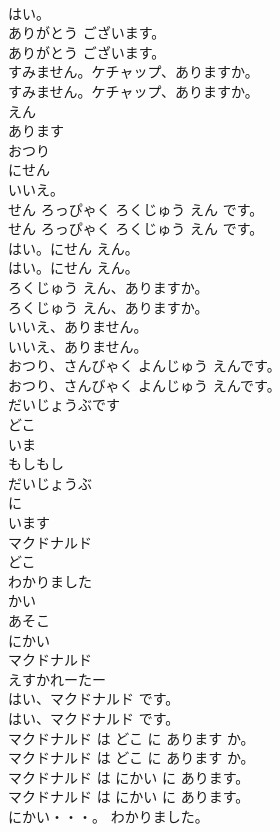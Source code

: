 \documentclass[8pt]{extreport}
\begin{document}
\begin{CJK}{UTF8}{min}
\\	はい。 
\\	ありがとう ございます。	
\\	ありがとう ございます。 
\\	すみません。ケチャップ、ありますか。	
\\	すみません。ケチャップ、ありますか。 
\\	えん
\\	あります
\\	おつり
\\	にせん
\\	いいえ。
\\	せん ろっぴゃく ろくじゅう えん です。	
\\	せん ろっぴゃく ろくじゅう えん です。 
\\	はい。にせん えん。	
\\	はい。にせん えん。 
\\	ろくじゅう えん、ありますか。	
\\	ろくじゅう えん、ありますか。 
\\	いいえ、ありません。	
\\	いいえ、ありません。 
\\	おつり、さんびゃく よんじゅう えんです。	
\\	おつり、さんびゃく よんじゅう えんです。 
\\	だいじょうぶです
\\	どこ
\\	いま
\\	もしもし
\\	だいじょうぶ
\\	に
\\	います
\\	マクドナルド
\\	どこ
\\	わかりました
\\	かい
\\	あそこ
\\	にかい
\\	マクドナルド
\\	えすかれーたー
\\	はい、マクドナルド です。	
\\	はい、マクドナルド です。 
\\	マクドナルド は どこ に あります か。	
\\	マクドナルド は どこ に あります か。 
\\	マクドナルド は にかい に あります。	
\\	マクドナルド は にかい に あります。 
\\	にかい・・・。 わかりました。	

\end{CJK}
\end{document}
